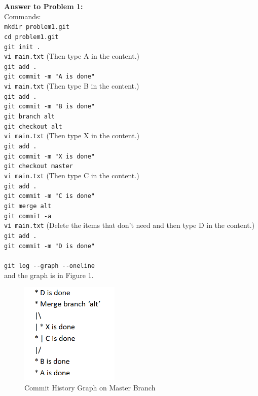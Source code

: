 \documentclass[12pt]{article}
\begin{document}
\bigskip
\noindent\textbf{Answer to Problem 1:}\\
Commands:\\
\verb+mkdir problem1.git+\\
\verb+cd problem1.git+\\
\verb+git init .+\\
\verb+vi main.txt+ (Then type A in the content.)\\
\verb+git add .+\\
\verb+git commit -m "A is done"+\\
\verb+vi main.txt+ (Then type B in the content.)\\
\verb+git add .+\\
\verb+git commit -m "B is done"+\\
\verb+git branch alt+\\
\verb+git checkout alt+\\
\verb+vi main.txt+ (Then type X in the content.)\\
\verb+git add .+\\
\verb+git commit -m "X is done"+\\
\verb+git checkout master+\\
\verb+vi main.txt+ (Then type C in the content.)\\
\verb+git add .+\\
\verb+git commit -m "C is done"+\\
\verb+git merge alt+\\
\verb+git commit -a+\\
\verb+vi main.txt+ (Delete the items that don't need and then type D in the content.)\\
\verb+git add .+\\
\verb+git commit -m "D is done"+\\


\\
\verb+git log --graph --oneline+\\
and the graph is in Figure 1.

\begin{figure}[!htb]
    \begin{center}
        \includegraphics[width=0.42\textwidth]{master.png}
    \end{center}
    \caption{Commit History Graph on Master Branch}
\end{figure}
\end{document}
